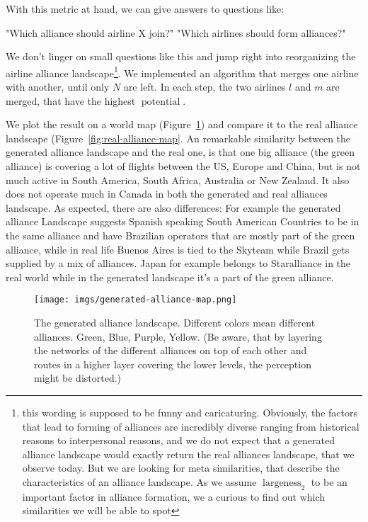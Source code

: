 \documentclass[twocolumn]{tum-article}
\DeclareMathOperator{\Largeness}{largeness}
\DeclareMathOperator{\Potential}{potential}
\begin{document}
With this metric at hand, we can give answers to questions like: 

"Which alliance should airline X join?"
"Which airlines should form alliances?" 


We don't linger on small questions like this and jump right into reorganizing the airline alliance landscape\footnote{this wording is supposed to be funny and caricaturing. Obviously, the factors that lead to forming of alliances are incredibly diverse ranging from historical reasons to interpersonal reasons, and we do not expect that a generated alliance landscape would exactly return the real alliances landscape, that we observe today. But we are looking for meta similarities, that describe the characteristics of an alliance landscape. As we assume $\Largeness_{2}$ to be an important factor in alliance formation, we a curious to find out which similarities we will be able to spot}. We implemented an algorithm that merges one airline with another, until only $N$ are left. In each step, the two airlines $l$ and $m$ are merged, that have the highest $\Potential$.

We plot the result on a world map (Figure~\ref{fig:generated-alliance-map}) and compare it to the real alliance landscape (Figure~\ref{fig:real-alliance-map}. An remarkable similarity between the generated alliance landscape and the real one, is that one big alliance (the green alliance) is covering a lot of flights between the US, Europe and China, but is not much active in South America, South Africa, Australia or New Zealand. It also does not operate much in Canada in both the generated and real alliances landscape. 
As expected, there are also differences: For example the generated alliance Landscape suggests Spanish speaking South American Countries to be in the same alliance and have Brazilian operators that are mostly part of the green alliance, while in real life Buenos Aires is tied to the Skyteam while Brazil gets supplied by a mix of alliances. Japan for example belongs to Staralliance in the real world while in the generated landscape it's a part of the green alliance. 

\begin{figure}
	\centering
	\texttt{[image: imgs/generated-alliance-map.png]}
	\caption{
The generated alliance landscape. Different colors mean different alliances. Green, Blue, Purple, Yellow. (Be aware, that by layering the networks of the different alliances on top of each other and routes in a higher layer covering the lower levels, the perception might be distorted.)}
	\label{fig:generated-alliance-map}
\end{figure}
\end{document}
